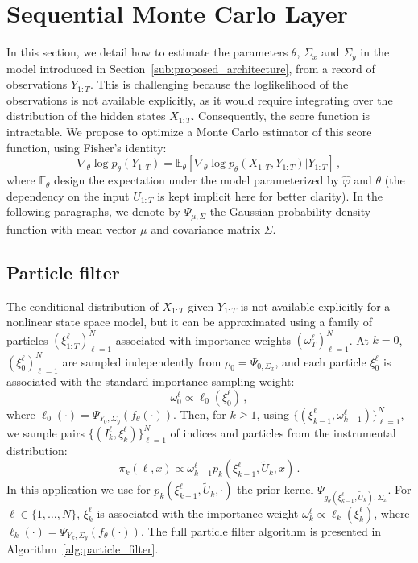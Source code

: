 \documentclass[journal]{IEEEtran}
\begin{document}
\section{Sequential Monte Carlo Layer}%
\label{sub:uncertainty_estimation}
In this section, we detail how to estimate the parameters $\theta$, $\Sigma_x$ and $\Sigma_y$ in the model introduced in Section~\ref{sub:proposed_architecture}, from a record of observations $Y_{1:T}$.
This is challenging because the loglikelihood of the observations is not available explicitly, as it would require integrating over the distribution of the hidden states $X_{1:T}$.
Consequently, the score function is intractable.
We propose to optimize a Monte Carlo estimator of this score function, using Fisher's identity:
\begin{equation}
	\nabla_\theta \log p_\theta(Y_{1:T}) = \mathbb{E}_\theta \left[ \nabla_\theta\log p_\theta(X_{1:T}, Y_{1:T}) | Y_{1:T} \right]\,,
	\label{eq:grad_ll}
\end{equation}
where $\mathbb{E}_\theta$ design the expectation under the model parameterized by $\widehat \varphi$ and $\theta$ (the dependency on the input $U_{1:T}$ is kept implicit here for better clarity).
In the following paragraphs, we denote by $\Psi_{\mu, \Sigma}$ the Gaussian probability density function with mean vector $\mu$ and covariance matrix $\Sigma$.

\subsection{Particle filter}
The conditional distribution of $X_{1:T}$ given $Y_{1:T}$ is not available explicitly for a nonlinear state space model, but it can be approximated using a family of particles $(\xi^{\ell}_{1:T})_{\ell=1}^N$ associated with importance weights $(\omega^{\ell}_T)_{\ell=1}^N$.
At $k = 0$, $(\xi^{\ell}_0)_{\ell=1}^N$ are sampled independently from $\rho_0 = \Psi_{0, \Sigma_x}$, and each particle $\xi^{\ell}_0$ is associated with the standard importance sampling weight:
\[
	\omega_0^{\ell} \propto \ell_0 \left(\xi^{\ell}_0\right)\,,
\]
where $\ell_0(\cdot) = \Psi_{Y_0, \Sigma_y}(f_\theta(\cdot))$.
Then, for $k\geq 1$, using $\{(\xi^{\ell}_{k-1},\omega^{\ell}_{k-1})\}_{\ell=1}^N$, we sample pairs $\{(I^{\ell}_k,\xi^{\ell}_{k})\}_{\ell=1}^N$ of indices and particles from the instrumental distribution:
\[
	\pi_{k}(\ell,x) \propto \omega_{k-1}^{\ell} p_k(\xi^{\ell}_{k-1},\widetilde U_k,x)\,.
\]
In this application we use for $p_k(\xi^{\ell}_{k-1},\widetilde U_k,\cdot)$ the prior kernel $\Psi_{g_\theta(\xi^\ell_{k-1}, \tilde U_k), \Sigma_x}$.
For $\ell \in \{1,\ldots,N\}$, $\xi^{\ell}_k$ is associated with the importance weight $\omega^{\ell}_k \propto \ell_k(\xi^{\ell}_k)$, where $\ell_k(\cdot) = \Psi_{Y_k, \Sigma_y}(f_\theta(\cdot))$.
The full particle filter algorithm is presented in Algorithm~\ref{alg:particle_filter}.
\end{document}
